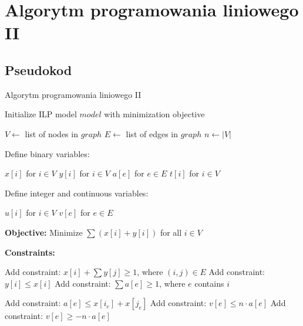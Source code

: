 \FloatBarrier
\section{Algorytm programowania liniowego II}

\subsection{Pseudokod}
\begin{algorithm}
    \caption*{Algorytm programowania liniowego II}
    \begin{algorithmic}[1]
            \State Initialize ILP model $model$ with minimization objective
    
            \State $V \gets$ list of nodes in $graph$
            \State $E \gets$ list of edges in $graph$
            \State $n \gets |V|$ 
    
            \State Define binary variables:

            \State $x[i]$ for $i \in V$ 
            \State $y[i]$ for $i \in V$ 
            \State $a[e]$ for $e \in E$ 
            \State $t[i]$ for $i \in V$ 

    
            \State Define integer and continuous variables:

            \State $u[i]$ for $i \in V$ 
            \State $v[e]$ for $e \in E$ 


            \State \textbf{Objective:}
            \State Minimize $\sum (x[i] + y[i])$ for all $i \in V$
    
            \State \textbf{Constraints:}
    
             
                \State Add constraint: $x[i] + \sum y[j] \geq 1$, where $(i,j) \in E$
                \State Add constraint: $y[i] \leq x[i]$
                \State Add constraint: $\sum a[e] \geq 1$, where $e$ contains $i$
            \EndFor
    
                \State Add constraint: $a[e] \leq x[i_e] + x[j_e]$
                \State Add constraint: $v[e] \leq n \cdot a[e]$
                \State Add constraint: $v[e] \geq -n \cdot a[e]$
            \EndFor
    

\end{algorithmic}
\end{algorithm}
